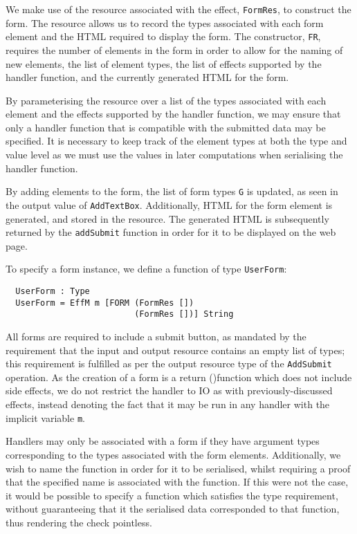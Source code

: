 We make use of the resource associated with the effect, \texttt{FormRes}, to
construct the form. The resource allows us to record the types associated with
each form element and the HTML required to display the form. The constructor,
\texttt{FR}, requires the number of elements in the form in order to allow for
the naming of new elements, the list of element types, the list of effects
supported by the handler function, and the currently generated HTML for the
form. 

By parameterising the resource over a list of the types associated with each element and the effects supported by the handler function, we may ensure that only a handler function that is compatible with the submitted data may be specified. It is necessary to keep track of the element types at both the type and value level as we must use the values in later computations when serialising the handler function. 

By adding elements to the form, the list of form types \texttt{G} is updated, as seen in the output value of \texttt{AddTextBox}. Additionally, HTML for the form element is generated, and stored in the resource. The generated HTML is subsequently returned by the \texttt{addSubmit} function in order for it to be displayed on the web page.

To specify a form instance, we define a function of type \texttt{UserForm}:
\begin{Verbatim}
  UserForm : Type
  UserForm = EffM m [FORM (FormRes []) 
                          (FormRes [])] String
\end{Verbatim}
All forms are required to include a submit button, as mandated by the
requirement that the input and output resource contains an empty list of types;
this requirement is fulfilled as per the output resource type of the
\texttt{AddSubmit} operation. As the creation of a form is a return ()function
which does not include side effects, we do not restrict the handler to IO as
with previously-discussed effects, instead denoting the fact that it may be run
in any handler with the implicit variable \texttt{m}.

Handlers may only be associated with a form if they have argument types corresponding to the types associated with the form elements. Additionally, we wish to name the function in order for it to be serialised, whilst requiring a proof that the specified name is associated with the function. If this were not the case, it would be possible to specify a function which satisfies the type requirement, without guaranteeing that it the serialised data corresponded to that function, thus rendering the check pointless. 

